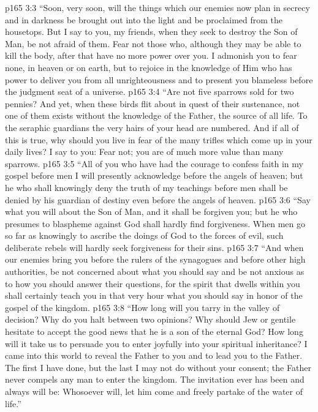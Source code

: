 \vs p165 3:3 \textcolor{ubdarkred}{“Soon, very soon, will the things which our enemies now plan in secrecy and in darkness be brought out into the light and be proclaimed from the housetops. But I say to you, my friends, when they seek to destroy the Son of Man, be not afraid of them. Fear not those who, although they may be able to kill the body, after that have no more power over you. I admonish you to fear none, in heaven or on earth, but to rejoice in the knowledge of Him who has power to deliver you from all unrighteousness and to present you blameless before the judgment seat of a universe.}
\vs p165 3:4 \textcolor{ubdarkred}{“Are not five sparrows sold for two pennies? And yet, when these birds flit about in quest of their sustenance, not one of them exists without the knowledge of the Father, the source of all life. To the seraphic guardians the very hairs of your head are numbered. And if all of this is true, why should you live in fear of the many trifles which come up in your daily lives? I say to you: Fear not; you are of much more value than many sparrows.}
\vs p165 3:5 \textcolor{ubdarkred}{“All of you who have had the courage to confess faith in my gospel before men I will presently acknowledge before the angels of heaven; but he who shall knowingly deny the truth of my teachings before men shall be denied by his guardian of destiny even before the angels of heaven.}
\vs p165 3:6 \textcolor{ubdarkred}{“Say what you will about the Son of Man, and it shall be forgiven you; but he who presumes to blaspheme against God shall hardly find forgiveness. When men go so far as knowingly to ascribe the doings of God to the forces of evil, such deliberate rebels will hardly seek forgiveness for their sins.}
\vs p165 3:7 \textcolor{ubdarkred}{“And when our enemies bring you before the rulers of the synagogues and before other high authorities, be not concerned about what you should say and be not anxious as to how you should answer their questions, for the spirit that dwells within you shall certainly teach you in that very hour what you should say in honor of the gospel of the kingdom.}
\vs p165 3:8 \textcolor{ubdarkred}{“How long will you tarry in the valley of decision? Why do you halt between two opinions? Why should Jew or gentile hesitate to accept the good news that he is a son of the eternal God? How long will it take us to persuade you to enter joyfully into your spiritual inheritance? I came into this world to reveal the Father to you and to lead you to the Father. The first I have done, but the last I may not do without your consent; the Father never compels any man to enter the kingdom. The invitation ever has been and always will be: Whosoever will, let him come and freely partake of the water of life.”}\plusone
